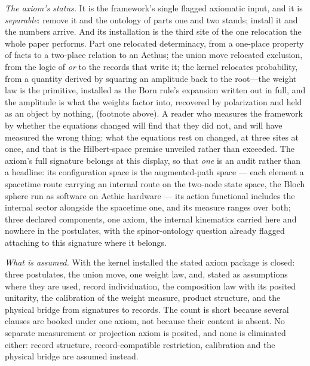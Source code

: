 \documentclass[11pt]{article}
\theoremstyle{definition}
\newcommand{\Aethus}{Aethus}
\begin{document}
\textit{The axiom's status.} It is the framework's single flagged axiomatic input, and it is \emph{separable}: remove it and the ontology of parts one and two stands; install it and the numbers arrive. And its installation is the third site of the one relocation the whole paper performs. Part one relocated determinacy, from a one-place property of facts to a two-place relation to an \Aethus{}; the union move relocated exclusion, from the logic of \emph{or} to the records that write it; the kernel relocates probability, from a quantity derived by squaring an amplitude back to the root---the weight law is the primitive, installed as the Born rule's expansion written out in full, and the amplitude is what the weights factor into, recovered by polarization and held as an object by nothing, (footnote above). A reader who measures the framework by whether the equations changed will find that they did not, and will have measured the wrong thing: what the equations rest on changed, at three sites at once, and that is the Hilbert-space premise unveiled rather than exceeded. The axiom's full signature belongs at this display, so that \emph{one} is an audit rather than a headline: its configuration space is the augmented-path space --- each element a spacetime route carrying an internal route on the two-node state space, the Bloch sphere run as software on Aethic hardware --- its action functional includes the internal sector alongside the spacetime one, and its measure ranges over both; three declared components, one axiom, the internal kinematics carried here and nowhere in the postulates, with the spinor-ontology question already flagged attaching to this signature where it belongs.

\textit{What is assumed.} With the kernel installed the stated axiom package is closed: three postulates, the union move, one weight law, and, stated as assumptions where they are used, record individuation, the composition law with its posited unitarity, the calibration of the weight measure, product structure, and the physical bridge from signatures to records. The count is short because several clauses are booked under one axiom, not because their content is absent. No separate measurement or projection axiom is posited, and none is eliminated either: record structure, record-compatible restriction, calibration and the physical bridge are assumed instead.
\end{document}
